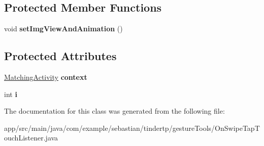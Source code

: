 \subsection*{Protected Member Functions}
\begin{DoxyCompactItemize}
\item 
void {\bfseries set\+Img\+View\+And\+Animation} ()\hypertarget{classcom_1_1example_1_1sebastian_1_1tindertp_1_1gestureTools_1_1OnSwipeTapTouchListener_ac7c0f412be5d04b2defb3b13af7d4b75}{}\label{classcom_1_1example_1_1sebastian_1_1tindertp_1_1gestureTools_1_1OnSwipeTapTouchListener_ac7c0f412be5d04b2defb3b13af7d4b75}

\end{DoxyCompactItemize}
\subsection*{Protected Attributes}
\begin{DoxyCompactItemize}
\item 
\hyperlink{classcom_1_1example_1_1sebastian_1_1tindertp_1_1MatchingActivity}{Matching\+Activity} {\bfseries context}\hypertarget{classcom_1_1example_1_1sebastian_1_1tindertp_1_1gestureTools_1_1OnSwipeTapTouchListener_acbd163e244544835023513f086e856a6}{}\label{classcom_1_1example_1_1sebastian_1_1tindertp_1_1gestureTools_1_1OnSwipeTapTouchListener_acbd163e244544835023513f086e856a6}

\item 
int {\bfseries i}\hypertarget{classcom_1_1example_1_1sebastian_1_1tindertp_1_1gestureTools_1_1OnSwipeTapTouchListener_aee2539d969381b01946c3e3d84c3ef8f}{}\label{classcom_1_1example_1_1sebastian_1_1tindertp_1_1gestureTools_1_1OnSwipeTapTouchListener_aee2539d969381b01946c3e3d84c3ef8f}

\end{DoxyCompactItemize}


The documentation for this class was generated from the following file\+:\begin{DoxyCompactItemize}
\item 
app/src/main/java/com/example/sebastian/tindertp/gesture\+Tools/On\+Swipe\+Tap\+Touch\+Listener.\+java\end{DoxyCompactItemize}
